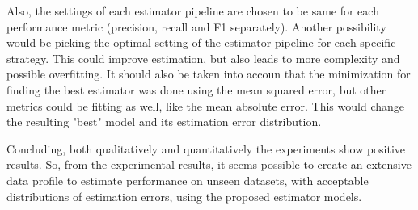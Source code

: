 Also, the settings of each estimator pipeline are chosen to be same for each performance metric (precision, recall and F1 separately). Another possibility would be picking the optimal setting of the estimator pipeline for each specific strategy. This could improve estimation, but also leads to more complexity and possible overfitting. It should also be taken into accoun that the minimization for finding the best estimator was done using the mean squared error, but other metrics could be fitting as well, like the mean absolute error. This would change the resulting "best" model and its estimation error distribution.

Concluding, both qualitatively and quantitatively the experiments show positive results. So, from the experimental results, it seems possible to create an extensive data profile to estimate performance on unseen datasets, with acceptable distributions of estimation errors, using the proposed estimator models. 